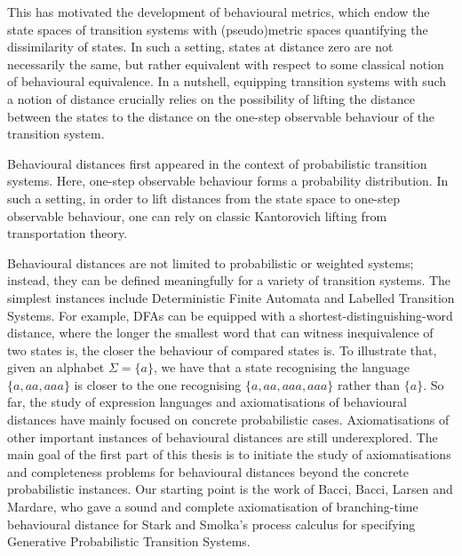 This has motivated the development of behavioural metrics, which endow the state spaces of transition systems with (pseudo)metric spaces quantifying the dissimilarity of states. In such a setting, states at distance zero are not necessarily the same, but rather equivalent with respect to some classical notion of behavioural equivalence. In a nutshell, equipping transition systems with such a notion of distance crucially relies on the possibility of lifting the distance between the states to the distance on the one-step observable behaviour of the transition system.

Behavioural distances first appeared in the context of probabilistic transition systems. Here, one-step observable behaviour forms a probability distribution. In such a setting, in order to lift distances from the state space to one-step observable behaviour, one can rely on classic Kantorovich lifting from transportation theory. 

Behavioural distances are not limited to probabilistic or weighted systems; instead, they can be defined meaningfully for a variety of transition systems. The simplest instances include Deterministic Finite Automata and Labelled Transition Systems. For example, DFAs can be equipped with a shortest-distinguishing-word distance, where the longer the smallest word that can witness inequivalence of two states is, the closer the behaviour of compared states is. To illustrate that, given an alphabet $\Sigma = \{a\}$, we have that a state recognising the language $\{a,aa, aaa\}$ is closer to the one recognising $\{a,aa,aaa,aaa\}$ rather than $\{a\}$. So far, the study of expression languages and axiomatisations of behavioural distances have mainly focused on concrete probabilistic cases. Axiomatisations of other important instances of behavioural distances are still underexplored. The main goal of the first part of this thesis is to initiate the study of axiomatisations and completeness problems for behavioural distances beyond the concrete probabilistic instances. Our starting point is the work of Bacci, Bacci, Larsen and Mardare, who gave a sound and complete axiomatisation of branching-time behavioural distance for Stark and Smolka's process calculus for specifying Generative Probabilistic Transition Systems. 






